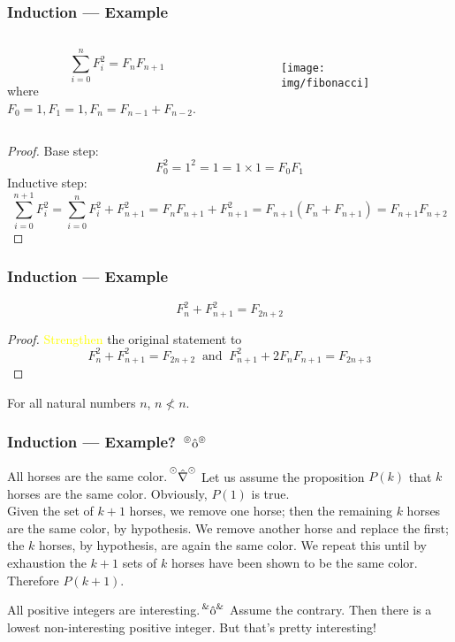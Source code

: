\documentclass[UTF8,aspectratio=43,11pt,colorlinks,compress,openany]{beamer}%
\begin{document}
\begin{frame}\frametitle{Induction --- Example}
	\begin{columns}
			\begin{theorem}
				\[\sum\limits_{i=0}^nF_i^2=F_nF_{n+1}\]
				where $F_0=1, F_1=1, F_n=F_{n-1}+F_{n-2}$.
			\end{theorem}
		\begin{figure}
			\texttt{[image: img/fibonacci]}
		\end{figure}
	\end{columns}
	\begin{proof}
		Base step:
		\[F_0^2=1^2=1=1\times 1=F_0F_1\]
		Inductive step:
		\[\sum\limits_{i=0}^{n+1}F_i^2=\sum\limits_{i=0}^n F_i^2+F_{n+1}^2=F_nF_{n+1}+F_{n+1}^2=F_{n+1}(F_n+F_{n+1})=F_{n+1}F_{n+2}\]
	\end{proof}
\end{frame}

\begin{frame}\frametitle{Induction --- Example}
	\begin{theorem}
		\[F_n^2+F_{n+1}^2=F_{2n+2}\]
	\end{theorem}\setlength\belowdisplayskip{0pt}
	\begin{proof}
		\textcolor{yellow}{Strengthen} the original statement to
		\[F_n^2+F_{n+1}^2=F_{2n+2}\;\;\text{and}\;\;F_{n+1}^2+2F_nF_{n+1}=F_{2n+3}\]
	\end{proof}
	\begin{problem}
		For all natural numbers $n$, $n\not< n$.
	\end{problem}
\end{frame}

\begin{frame}\frametitle{Induction --- Example? $\sideset{^\circledcirc}{^\circledcirc}{\operatorname{\hat{o}}}$}
	\begin{block}{All horses are the same color.$\sideset{^{\odot}}{^{\odot}}{\operatorname{\hat{\nabla}}}$}
		Let us assume the proposition $P(k)$ that $k$ horses are the same color. Obviously, $P(1)$ is true.\\
		Given the set of $k+1$ horses, we remove one horse; then the remaining $k$ horses are the same color, by hypothesis. We remove another horse and replace the first; the $k$ horses, by hypothesis, are again the same color. We repeat this until by exhaustion the $k+1$ sets of $k$ horses have been shown to be the same color. Therefore $P(k+1)$.
	\end{block}
	\begin{block}{All positive integers are interesting.$\sideset{^\&}{^\&}{\operatorname{\hat{o}}}$}
		Assume the contrary. Then there is a lowest non-interesting positive integer. But that's pretty interesting!
	\end{block}
\end{frame}
\end{document}
